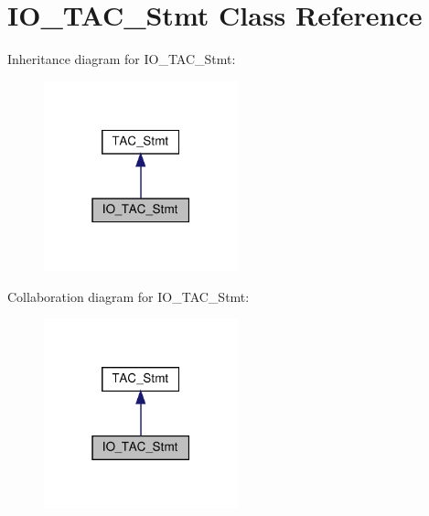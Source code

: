 \hypertarget{classIO__TAC__Stmt}{}\section{I\+O\+\_\+\+T\+A\+C\+\_\+\+Stmt Class Reference}
\label{classIO__TAC__Stmt}


Inheritance diagram for I\+O\+\_\+\+T\+A\+C\+\_\+\+Stmt\+:
\nopagebreak
\begin{figure}[H]
\begin{center}
\leavevmode
\includegraphics[width=159pt]{classIO__TAC__Stmt__inherit__graph}
\end{center}
\end{figure}


Collaboration diagram for I\+O\+\_\+\+T\+A\+C\+\_\+\+Stmt\+:
\nopagebreak
\begin{figure}[H]
\begin{center}
\leavevmode
\includegraphics[width=159pt]{classIO__TAC__Stmt__coll__graph}
\end{center}
\end{figure}
